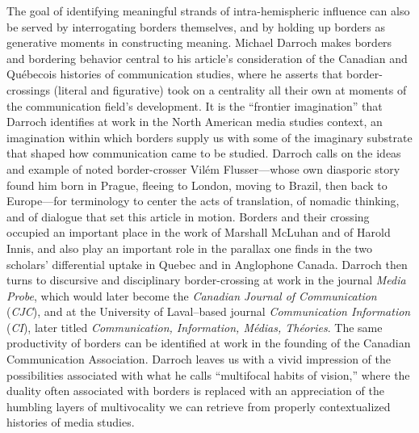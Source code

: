 \documentclass{tufte-handout}
\begin{document}
The goal of identifying meaningful strands of intra-hemispheric
influence can also be served by interrogating borders themselves, and by
holding up borders as generative moments in constructing meaning.
Michael Darroch makes borders and bordering behavior central to his
article's consideration of the Canadian and Québecois histories of
communication studies, where he asserts that border-crossings (literal
and figurative) took on a centrality all their own at moments of the
communication field's development. It is the ``frontier imagination''
that Darroch identifies at work in the North American media studies
context, an imagination within which borders supply us with some of the
imaginary substrate that shaped how communication came to be studied.
Darroch calls on the ideas and example of noted border-crosser Vilém
Flusser---whose own diasporic story found him born in Prague, fleeing to
London, moving to Brazil, then back to Europe---for terminology to
center the acts of translation, of nomadic thinking, and of dialogue
that set this article in motion. Borders and their crossing occupied an
important place in the work of Marshall McLuhan and of Harold Innis, and
also play an important role in the parallax one finds in the two
scholars' differential uptake in Quebec and in Anglophone Canada.
Darroch then turns to discursive and disciplinary border-crossing at
work in the journal \emph{Media Probe}, which would later become the
\emph{Canadian Journal of Communication} (\emph{CJC}), and at the
University of Laval--based journal \emph{Communication Information}
(\emph{CI}), later titled \emph{Communication, Information, Médias,
Théories}. The same productivity of borders can be identified at work in
the founding of the Canadian Communication Association. Darroch leaves
us with a vivid impression of the possibilities associated with what he
calls ``multifocal habits of vision,'' where the duality often
associated with borders is replaced with an appreciation of the humbling
layers of multivocality we can retrieve from properly contextualized
histories of media studies.
\end{document}
